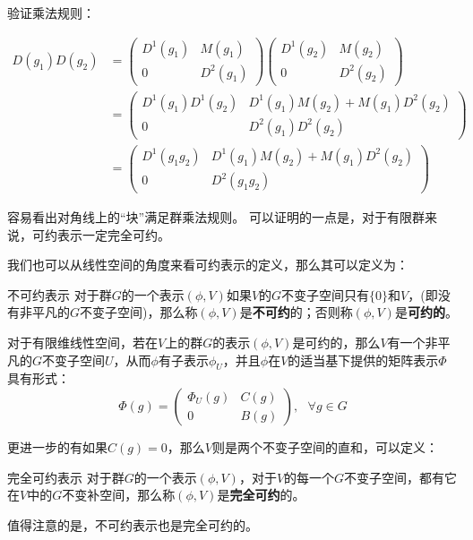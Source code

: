 验证乘法规则：

\begin{align}
D(g_1)D(g_2)&=
\begin{pmatrix}
 D^1(g_1) & M(g_1)\\
 0 & D^2(g_1)
\end{pmatrix}
\begin{pmatrix}
 D^1(g_2) & M(g_2)\\
 0 & D^2(g_2)
\end{pmatrix} \\
&=\begin{pmatrix}
 D^1(g_1)D^1(g_2) & D^1(g_1)M(g_2)+M(g_1)D^2(g_2)\\
 0 & D^2(g_1)D^2(g_2)
\end{pmatrix} \\
&=\begin{pmatrix}
 D^1(g_1g_2) & D^1(g_1)M(g_2)+M(g_1)D^2(g_2)\\
 0 & D^2(g_1g_2)
\end{pmatrix}
\end{align}

容易看出对角线上的“块”满足群乘法规则。
可以证明的一点是，对于有限群来说，可约表示一定完全可约。







我们也可以从线性空间的角度来看可约表示的定义，那么其可以定义为：

\begin{definition}{不可约表示}
对于群$G$的一个表示$(\phi,V)$如果$V$的$G$不变子空间只有$\{0\}$和$V$，(即没有非平凡的$G$不变子空间)，那么称$(\phi,V)$是\textbf{不可约}的；否则称$(\phi,V)$是\textbf{可约的}。
\end{definition}

\begin{definition}{}
对于有限维线性空间，若在$V$上的群$G$的表示$(\phi,V)$是可约的，那么$V$有一个非平凡的$G$不变子空间$U$，从而$\phi$有子表示$\phi_U$，并且$\phi$在$V$的适当基下提供的矩阵表示$\Phi$具有形式：
$$\Phi(g)=\begin{pmatrix}
 \Phi_U(g) & C(g)\\
 0 & B(g)
\end{pmatrix},~~~\forall g\in G$$

\end{definition}

更进一步的有如果$C(g)=0$，那么$V$则是两个不变子空间的直和，可以定义：
\begin{definition}{完全可约表示}
对于群$G$的一个表示$(\phi,V)$，对于$V$的每一个$G$不变子空间，都有它在$V$中的$G$不变补空间，那么称$(\phi,V)$是\textbf{完全可约}的。
\end{definition}

值得注意的是，不可约表示也是完全可约的。












